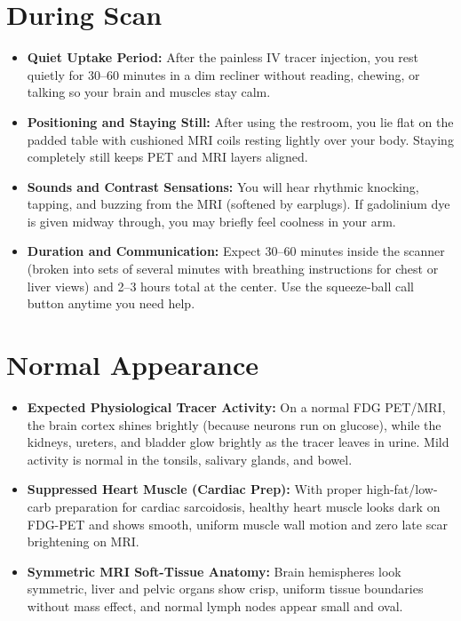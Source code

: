\section{During Scan}
\begin{itemize}
\item \textbf{Quiet Uptake Period:} After the painless IV tracer injection, you rest quietly for 30--60 minutes in a dim recliner without reading, chewing, or talking so your brain and muscles stay calm.
\item \textbf{Positioning and Staying Still:} After using the restroom, you lie flat on the padded table with cushioned MRI coils resting lightly over your body. Staying completely still keeps PET and MRI layers aligned.
\item \textbf{Sounds and Contrast Sensations:} You will hear rhythmic knocking, tapping, and buzzing from the MRI (softened by earplugs). If gadolinium dye is given midway through, you may briefly feel coolness in your arm.
\item \textbf{Duration and Communication:} Expect 30--60 minutes inside the scanner (broken into sets of several minutes with breathing instructions for chest or liver views) and 2--3 hours total at the center. Use the squeeze-ball call button anytime you need help.
\end{itemize}

\section{Normal Appearance}
\begin{itemize}
\item \textbf{Expected Physiological Tracer Activity:} On a normal FDG PET/MRI, the brain cortex shines brightly (because neurons run on glucose), while the kidneys, ureters, and bladder glow brightly as the tracer leaves in urine. Mild activity is normal in the tonsils, salivary glands, and bowel.
\item \textbf{Suppressed Heart Muscle (Cardiac Prep):} With proper high-fat/low-carb preparation for cardiac sarcoidosis, healthy heart muscle looks dark on FDG-PET and shows smooth, uniform muscle wall motion and zero late scar brightening on MRI.
\item \textbf{Symmetric MRI Soft-Tissue Anatomy:} Brain hemispheres look symmetric, liver and pelvic organs show crisp, uniform tissue boundaries without mass effect, and normal lymph nodes appear small and oval.
\end{itemize}

